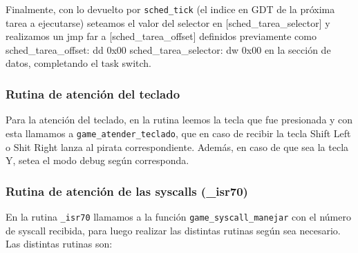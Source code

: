Finalmente, con lo devuelto por \texttt{sched\_tick} (el indice en GDT de la próxima tarea a ejecutarse) seteamos el valor del selector en [sched\_tarea\_selector] y realizamos un jmp far a [sched\_tarea\_offset] definidos previamente como sched\_tarea\_offset: dd 0x00 sched\_tarea\_selector: dw 0x00 en la sección de datos, completando el task switch.\\

\subsubsection{Rutina de atención del teclado}

Para la atención del teclado, en la rutina leemos la tecla que fue presionada y con esta llamamos a \texttt{game\_atender\_teclado}, que en caso de recibir la tecla Shift Left o Shit Right lanza al pirata correspondiente. Además, en caso de que sea la tecla Y, setea el modo debug según corresponda.\\

\subsubsection{Rutina de atención de las syscalls (\_isr70)}

En la rutina \texttt{\_isr70} llamamos a la función \texttt{game\_syscall\_manejar} con el número de syscall recibida, para luego realizar las distintas rutinas según sea necesario. Las distintas rutinas son:


